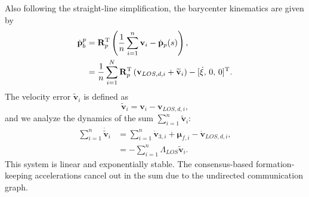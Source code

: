 Also following the straight-line simplification, the barycenter kinematics are given by
\begin{equation}
    \begin{split}
        \dot{\mathbf{p}}_b^p &= \mathbf{R}_p^{\rm T} \left(\frac{1}{n}\sum_{i=1}^n \mathbf{v}_{i} - \dot{\mathbf{p}}_p(s)\right),\\
        & = \frac{1}{n}\sum_{i=1}^N\mathbf{R}_p^{\rm T} \left(\mathbf{v}_{LOS,d,i} + \widetilde{\mathbf{v}}_{i}\right) - [\dot{\xi},\, 0,\, 0]^{\rm T}.
    \end{split}\label{eq:p_b_CL_1}
\end{equation}
The velocity error $\widetilde{\mathbf{v}}_i$ is defined as 
\begin{equation}
    \widetilde{\mathbf{v}}_i = \mathbf{v}_i - \mathbf{v}_{LOS,d,i},
\end{equation}
and we analyze the dynamics of the sum $\sum_{i=1}^n\widetilde{\mathbf{v}}_i$:
\begin{equation}
\begin{split}
    \sum_{i=1}^n \dot{\widetilde{\mathbf{v}}}_i &= \sum_{i=1}^n \dot{\mathbf{v}}_{3,i} + \bm{\mu}_{f,i} - \dot{\mathbf{v}}_{LOS,d,i},\\
    &=-\sum_{i=1}^n \Lambda_{LOS}\widetilde{\mathbf{v}}_i.
\end{split}
\end{equation}
This system is linear and exponentially stable. The consensus-based formation-keeping accelerations cancel out in the sum due to the undirected communication graph.


